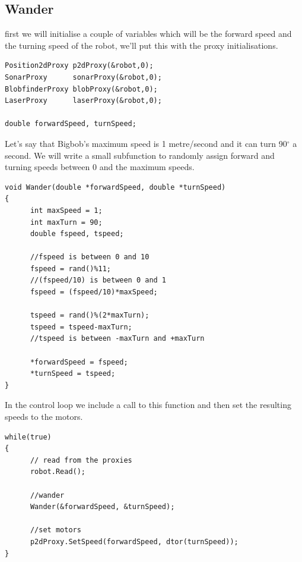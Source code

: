 \documentclass[a4paper]{report}
\begin{document}
\subsection{Wander}

first we will initialise a couple of variables which will be the forward speed and the turning speed of the robot, we'll put this with the proxy initialisations.
\begin{verbatim}
Position2dProxy p2dProxy(&robot,0);
SonarProxy      sonarProxy(&robot,0);
BlobfinderProxy blobProxy(&robot,0);
LaserProxy      laserProxy(&robot,0);

double forwardSpeed, turnSpeed;
\end{verbatim}

Let's say that Bigbob's maximum speed is 1 metre/second and it can turn 90$^\circ$ a second. We will write a small subfunction to randomly assign forward and turning speeds between 0 and the maximum speeds.
\begin{verbatim}
void Wander(double *forwardSpeed, double *turnSpeed)
{
      int maxSpeed = 1;
      int maxTurn = 90;
      double fspeed, tspeed;
	
      //fspeed is between 0 and 10
      fspeed = rand()%11;
      //(fspeed/10) is between 0 and 1
      fspeed = (fspeed/10)*maxSpeed;
	
      tspeed = rand()%(2*maxTurn);
      tspeed = tspeed-maxTurn;
      //tspeed is between -maxTurn and +maxTurn
	
      *forwardSpeed = fspeed;
      *turnSpeed = tspeed;
} 
\end{verbatim}
In the control loop we include a call to this function and then set the resulting speeds to the motors.
\begin{verbatim}
while(true)
{		
      // read from the proxies
      robot.Read();

      //wander
      Wander(&forwardSpeed, &turnSpeed);

      //set motors
      p2dProxy.SetSpeed(forwardSpeed, dtor(turnSpeed));
}
\end{verbatim}
\end{document}
